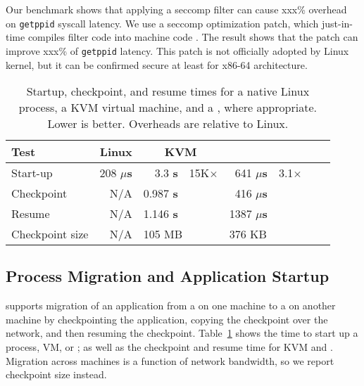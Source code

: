 \vspace{5pt}
Our benchmark shows that applying a seccomp filter can cause xxx\% overhead on {\tt getppid} syscall latency. We use a seccomp optimization patch, which just-in-time compiles filter code into machine code .
The result shows that the patch can improve xxx\% of {\tt getppid} latency.
This patch is not officially adopted by Linux kernel, but it can be confirmed secure at least for x86-64 architecture.


\begin{table}[t!b!]
\footnotesize
\centering
\begin{tabular}{|l|r|rr|rr|rr|}
\hline
{\bf Test } & {\bf Linux } & \multicolumn{2}{|c|}{{\bf KVM}}
& \multicolumn{2}{|c|}{{\bf \sysname{}}}\\
\hline

Start-up & 208 {\bf $\mu$s} & 3.3 {\bf s} & 15K$\times$ & 641 {\bf $\mu$s} & 3.1$\times$ \\
\hline
Checkpoint & N/A & 0.987 {\bf s} &  & 416  {\bf $\mu$s} & \\
\hline
Resume & N/A & 1.146 {\bf s}  &  &  1387 {\bf $\mu$s} &  \\
\hline\hline
Checkpoint size & N/A & \multicolumn{2}{|l|}{105 MB} & \multicolumn{2}{|l|}{376 KB}   \\
\hline
\end{tabular}
\caption[\sysname{}: startup, checkpoint, and resume times]
{Startup, checkpoint, and resume times for a native Linux process,
a KVM virtual machine,
and a \sysname{} \picoproc{}, where appropriate. Lower is better.  
Overheads are relative to Linux.} 
\label{tab:graphene:startup}
\end{table}

\subsection{Process Migration and Application Startup}

\sysname{} supports migration of an application from a \picoproc{} on one machine
to a \picoproc{} on another machine by checkpointing the application,
copying the checkpoint over the network, and then resuming the checkpoint.
Table~\ref{tab:graphene:startup} shows the time to start
up a process, VM, or \picoproc{}; as well as the checkpoint and resume time for KVM and \sysname{}.
Migration across machines is a function of network bandwidth,
so we report checkpoint size instead. %



